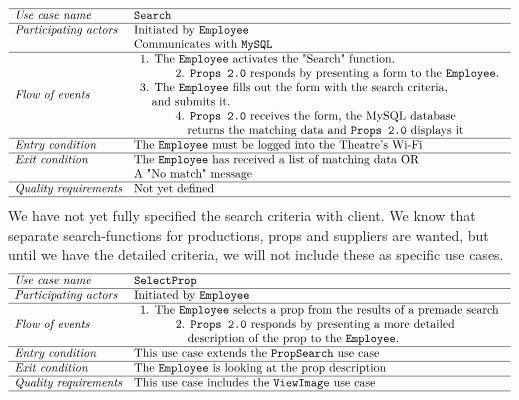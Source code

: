 \documentclass[12pt]{article}
\begin{document}
\[
\begin{array}{ll}
\hline
\textit{Use case name} & \texttt{Search} \\
\hline
\textit{Participating actors} & \text{Initiated by \texttt{Employee}} \\
& \text{Communicates with \texttt{MySQL}} \\
\hline
\textit{Flow of events} & 
\begin{array}{l}
\text{1. The \texttt{Employee} activates the "Search" function.}\\
\quad \quad \quad \text{2. \texttt{Props 2.0} responds by presenting a form to the \texttt{Employee}.} \\
\text{3. The \texttt{Employee} fills out the form with the search criteria,} \\ \quad \text{and submits it.} \\
\quad \quad \quad \text{4. \texttt{Props 2.0} receives the form, the MySQL database} \\ \quad \quad \quad \quad \text{returns the matching data and \texttt{Props 2.0} displays it}
\end{array} \\
\hline
\textit{Entry condition} & \text{The \texttt{Employee} must be logged into the Theatre's Wi-Fi} \\
\hline
\textit{Exit condition} & \text{The \texttt{Employee} has received a list of matching data OR} \\ & \text{A "No match"  message} \\
\hline
\textit{Quality requirements} & \text{Not yet defined} \\
\hline
\end{array}
\]
We have not yet fully specified the search criteria with client. We know that separate search-functions for productions, props and suppliers are wanted, but until we have the detailed criteria, we will not include these as specific use cases.  
\[
\begin{array}{ll}
\hline
\textit{Use case name} & \texttt{SelectProp} \\
\hline
\textit{Participating actors} & \text{Initiated by \texttt{Employee}} \\
\hline
\textit{Flow of events} & 
\begin{array}{l}
\text{1. The \texttt{Employee} selects a prop from the results of a premade search} \\
\quad \quad \quad \text{2. \texttt{Props 2.0} responds by presenting a more detailed}\\ \quad \quad \quad \quad \text{description of the prop to the \texttt{Employee}.}
\end{array} \\
\hline
\textit{Entry condition} & \text{This use case extends the  \texttt{PropSearch} use case} \\
\hline
\textit{Exit condition} & \text{The \texttt{Employee} is looking at the prop description} \\
\hline
\textit{Quality requirements} & \text{This use case includes the \texttt{ViewImage} use case} \\
\hline
\end{array}
\]
\end{document}
